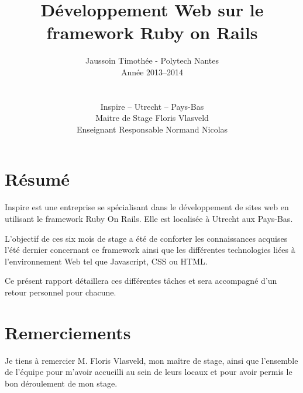 \documentclass[12pt,a4paper]{book}
\author{Jaussoin Timothée - Polytech Nantes\\ Année 2013--2014 \\
\\ \\ Inspire -- Utrecht -- Pays-Bas\\  Maitre de Stage Floris Vlasveld\\ Enseignant Responsable Normand Nicolas}
\title{Développement Web sur le framework Ruby on Rails}
\begin{document}
\begin{titlepage}
	\maketitle
\end{titlepage}

\tableofcontents

\newpage
\clearpage
{}
    \section*{Résumé}
	

  Inspire est une entreprise se spécialisant dans le développement de sites web en utilisant le framework Ruby On Rails. Elle est localisée à Utrecht aux Pays-Bas.
  
  L'objectif de ces six mois de stage a été de conforter les connaissances acquises l'été dernier concernant ce framework ainsi que les différentes technologies liées à l'environnement Web tel que Javascript, CSS ou HTML.

    Ce présent rapport détaillera ces différentes tâches et sera accompagné d'un retour personnel pour chacune.  

\newpage
\clearpage
{}
\section*{Remerciements}

Je tiens à remercier M. Floris Vlasveld, mon maître de stage, ainsi que l'ensemble de l'équipe pour m'avoir accueilli au sein de leurs locaux et pour avoir permis le bon déroulement de mon stage.

\end{document}
